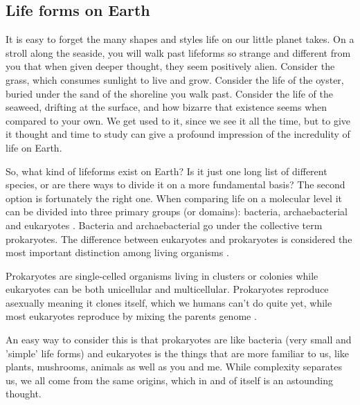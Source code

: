 \subsection*{Life forms on Earth}

It is easy to forget the many shapes and styles life on our little planet takes. On a stroll along the seaside, you will walk past lifeforms so strange and different from you that when given deeper thought, they seem positively alien.
Consider the grass, which consumes sunlight to live and grow. Consider the life of the oyster, buried under the sand of the shoreline you walk past.
Consider the life of the seaweed, drifting at the surface, and how bizarre that existence seems when compared to your own.
We get used to it, since we see it all the time, but to give it thought and time to study can give a profound impression of the incredulity of life on Earth.

So, what kind of lifeforms exist on Earth?
Is it just one long list of different species, or are there ways to divide it on a more fundamental basis?
The second option is fortunately the right one.
When comparing life on a molecular level it can be divided into three primary groups (or domains): bacteria, archaebacterial and eukaryotes \cite{Eukaryotes}.
Bacteria and archaebacterial go under the collective term prokaryotes.
The difference between eukaryotes and prokaryotes is considered the most important distinction among living organisms \cite{Procaryotes}.

Prokaryotes are single-celled organisms living in clusters or colonies while eukaryotes can be both unicellular and multicellular.
Prokaryotes reproduce asexually meaning it clones itself, which we humans can't do quite yet, while most eukaryotes reproduce by mixing the parents genome \cite{ProcaEuka}. 

An easy way to consider this is that prokaryotes are like bacteria (very small and 'simple' life forms) and eukaryotes is the things that are more familiar to us, like plants, mushrooms, animals as well as you and me.
While complexity separates us, we all come from the same origins, which in and of itself is an astounding thought.

